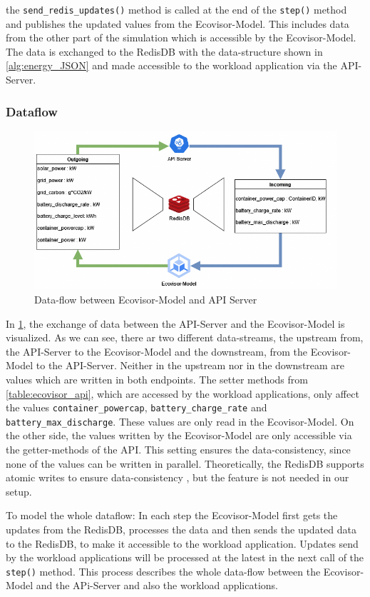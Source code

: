 the \texttt{send\_redis\_updates()} method is called at the end of the \texttt{step()} method and  publishes the updated values from the Ecovisor-Model. This includes data from the other part of the simulation which is accessible by the Ecovisor-Model.
The data is exchanged to the RedisDB with the data-structure shown in \ref{alg:energy_JSON} and made accessible to the workload application via the API-Server. 



\subsubsection{Dataflow}
\label{subsec:dataflow}
\begin{figure}
    \centering
    \includegraphics[width=\linewidth]{figures/Dataflow.drawio.png}
    \caption{Data-flow between Ecovisor-Model and API Server}
    \label{fig:dataflow}
\end{figure}

In \ref{fig:dataflow}, the exchange of data between the API-Server and the Ecovisor-Model is visualized. As we can see, there ar two different data-streams, the upstream from, the API-Server to the Ecovisor-Model and the downstream, from the Ecovisor-Model to the API-Server.
Neither in the upstream nor in the downstream are values which are written in both endpoints. The setter methods from \ref{table:ecovisor_api}, which are accessed by the workload applications, only affect the values \texttt{container\_powercap}, \texttt{battery\_charge\_rate} and \texttt{battery\_max\_discharge}. These values are only read in the Ecovisor-Model. On the other side, the values written by the Ecovisor-Model are only accessible via the getter-methods of the API. This setting ensures the data-consistency, since none of the values can be written in parallel. Theoretically, the RedisDB supports atomic writes to ensure data-consistency \cite{redis}, but the feature is not needed in our setup.

To model the whole dataflow: In each step the Ecovisor-Model first gets the updates from the RedisDB, processes the data and then sends the updated data to the RedisDB, to make it accessible to the workload application. Updates send by the workload applications will be processed at the latest in the next call of the \texttt{step()} method. This process describes the whole data-flow between the Ecovisor-Model and the APi-Server and also the workload applications.



